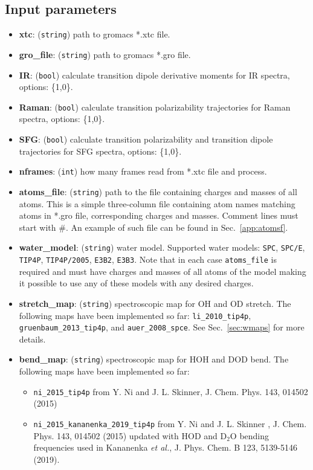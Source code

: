 \documentclass{article}
\begin{document}
\subsection{Input parameters}

\begin{itemize}

\item \textbf{xtc}: (\texttt{string}) path to gromacs *.xtc file.
\item \textbf{gro\_file}: (\texttt{string}) path to gromacs *.gro file.
\item \textbf{IR}: (\texttt{bool}) calculate transition dipole derivative moments for IR spectra, options: \{1,0\}.
\item \textbf{Raman}: (\texttt{bool}) calculate transition polarizability trajectories for Raman spectra, options: \{1,0\}.
\item \textbf{SFG}: (\texttt{bool}) calculate transition polarizability and transition dipole trajectories for SFG spectra, options: \{1,0\}.
\item \textbf{nframes}: (\texttt{int}) how many frames read from *.xtc file and process.
\item \textbf{atoms\_file}: (\texttt{string}) path to the file containing charges and masses of all atoms. This is a simple three-column file containing atom names matching atoms in 
*.gro file, corresponding charges and masses. Comment lines must start with \textsc{\#}. An example of such file can be found in Sec.~\ref{app:atomsf}.
\item \textbf{water\_model}: (\texttt{string}) water model. Supported water models: \texttt{SPC}, \texttt{SPC/E}, \texttt{TIP4P}, \texttt{TIP4P/2005}, \texttt{E3B2}, \texttt{E3B3}.
Note that in each case \texttt{atoms\_file} is required and must have charges and masses of all atoms of the model making it possible to use any of these models
with any desired charges.
\item \textbf{stretch\_map}: (\texttt{string}) spectroscopic map for OH and OD stretch. The following maps have been implemented so far:
 \texttt{li\_2010\_tip4p},  \texttt{gruenbaum\_2013\_tip4p}, and \texttt{auer\_2008\_spce}. See Sec.~\ref{sec:wmaps} for more details.

\item \textbf{bend\_map}: (\texttt{string}) spectroscopic map for HOH and DOD bend. 
The following maps have been implemented so far:
\begin{itemize}
\item \texttt{ni\_2015\_tip4p} from Y. Ni and J. L. Skinner, J. Chem. Phys. 143, 014502 (2015)
\item  \texttt{ni\_2015\_kananenka\_2019\_tip4p} from Y. Ni and J. L. Skinner , J. Chem. Phys. 143, 014502 (2015) updated with HOD and D$_2$O 
bending frequencies used in Kananenka \textit{et al.}, J. Phys. Chem. B 123, 5139-5146 (2019).
\end{itemize}



\end{itemize}
\end{document}
